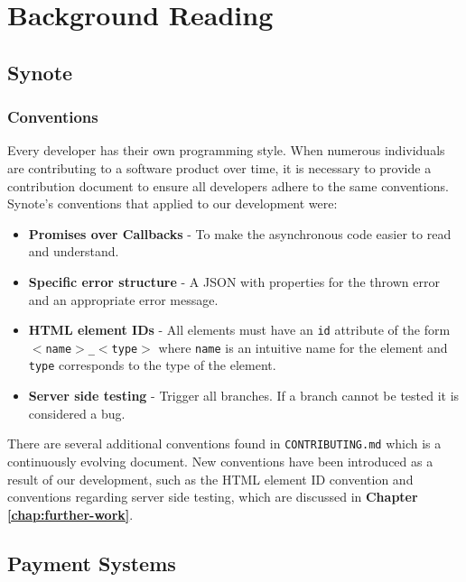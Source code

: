 \chapter{Background Reading}
\label{chap:background-reading}

\section{Synote}
\label{sec:synote}

\subsection{Conventions}
\label{subsec:conventions}

Every developer has their own programming style. When numerous individuals are contributing to a software product over time, it is necessary to provide a contribution document to ensure all developers adhere to the same conventions. Synote's conventions that applied to our development were:

\begin{itemize}
    \item \textbf{Promises over Callbacks} - To make the asynchronous code easier to read and understand.
    \item \textbf{Specific error structure} - A JSON with properties for the thrown error and an appropriate error message.
    \item \textbf{HTML element IDs} - All elements must have an \texttt{id} attribute of the form  \texttt{$<$name$>$\_$<$type$>$} where \texttt{name} is an intuitive name for the element and \texttt{type} corresponds to the type of the element. 
    \item \textbf{Server side testing} - Trigger all branches. If a branch cannot be tested it is considered a bug.\\ 
\end{itemize}

There are several additional conventions found in \texttt{CONTRIBUTING.md} which is a continuously evolving document. New conventions have been introduced as a result of our development, such as the HTML element ID convention and conventions regarding server side testing, which are discussed in \textbf{Chapter \ref{chap:further-work}}.  

\section{Payment Systems}
\label{sec:payment-systems}

